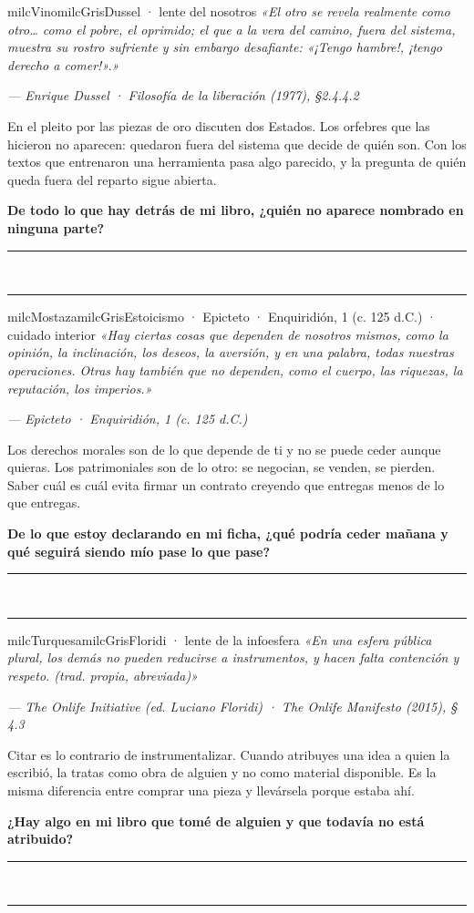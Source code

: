 \documentclass[11pt,letterpaper]{article}
\newcommand{\linead}[1]{\noindent\color{milcLinea}\rule{#1}{0.5pt}\color{milcNegro}}
\begin{document}
\begin{softbox}{milcVino}{milcGris}{Dussel · lente del nosotros}
\textit{«El otro se revela realmente como otro… como el pobre, el oprimido; el que a la vera del camino, fuera del sistema, muestra su rostro sufriente y sin embargo desafiante: «¡Tengo hambre!, ¡tengo derecho a comer!».»}

{\footnotesize\itshape\color{milcNegro!70}--- Enrique Dussel · Filosofía de la liberación (1977), §2.4.4.2}

En el pleito por las piezas de oro discuten dos Estados. Los orfebres que las hicieron no aparecen: quedaron fuera del sistema que decide de quién son. Con los textos que entrenaron una herramienta pasa algo parecido, y la pregunta de quién queda fuera del reparto sigue abierta.

\textbf{De todo lo que hay detrás de mi libro, ¿quién no aparece nombrado en ninguna parte?}
\end{softbox}
\linead{\linewidth}\\[1mm]
\linead{\linewidth}

\begin{softbox}{milcMostaza}{milcGris}{Estoicismo · Epicteto · Enquiridión, 1 (c. 125 d.C.) · cuidado interior}
\textit{«Hay ciertas cosas que dependen de nosotros mismos, como la opinión, la inclinación, los deseos, la aversión, y en una palabra, todas nuestras operaciones. Otras hay también que no dependen, como el cuerpo, las riquezas, la reputación, los imperios.»}

{\footnotesize\itshape\color{milcNegro!70}--- Epicteto · Enquiridión, 1 (c. 125 d.C.)}

Los derechos morales son de lo que depende de ti y no se puede ceder aunque quieras. Los patrimoniales son de lo otro: se negocian, se venden, se pierden. Saber cuál es cuál evita firmar un contrato creyendo que entregas menos de lo que entregas.

\textbf{De lo que estoy declarando en mi ficha, ¿qué podría ceder mañana y qué seguirá siendo mío pase lo que pase?}
\end{softbox}
\linead{\linewidth}\\[1mm]
\linead{\linewidth}

\begin{softbox}{milcTurquesa}{milcGris}{Floridi · lente de la infoesfera}
\textit{«En una esfera pública plural, los demás no pueden reducirse a instrumentos, y hacen falta contención y respeto. (trad. propia, abreviada)»}

{\footnotesize\itshape\color{milcNegro!70}--- The Onlife Initiative (ed. Luciano Floridi) · The Onlife Manifesto (2015), § 4.3}

Citar es lo contrario de instrumentalizar. Cuando atribuyes una idea a quien la escribió, la tratas como obra de alguien y no como material disponible. Es la misma diferencia entre comprar una pieza y llevársela porque estaba ahí.

\textbf{¿Hay algo en mi libro que tomé de alguien y que todavía no está atribuido?}
\end{softbox}
\linead{\linewidth}\\[1mm]
\linead{\linewidth}
\end{document}
